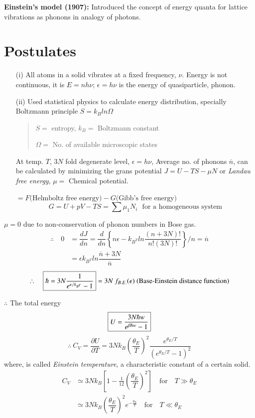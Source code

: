 \noindent
{\bf Einstein's model (1907):} Introduced the concept of energy quanta for lattice vibrations as phonons in analogy of photons.

\section*{Postulates}
\begin{itemize}
\itemsep=0pt
\item[(i)] All atoms in a solid vibrates at a fixed frequency, $\nu$. Energy is not continuous, it is $E=nh\nu$; $\epsilon=h\nu$ is the energy of quasiparticle, phonon.

\item[(ii)] Used statistical physics to calculate energy distribution, specially Boltzmann principle $S=k_{B}ln\Omega$
\begin{quote}
$S=$ entropy, $k_{B}=$ Boltzmann constant

$\Omega=$ No. of available microscopic states
\end{quote}
At temp. $T$, $3N$ fold degenerate level, $\epsilon=h\nu$, Average no. of phonons $\overline{n}$, can be calculated by minimizing the grans potential $J=U-TS-\mu N$ or {\em Landau free energy}, $\mu=$ Chemical potential.

$=F \text{(Helmboltz free energy)} -G \text{(Gibb's free energy)}$ 
$$
G=U+pV-TS=\sum\mu_{1}N_{i}\text{~ for a homogeneous system}
$$
\end{itemize}

$\mu=0$ due to non-conservation of phonon numbers in Bose gas.
\begin{align*}
\therefore\quad 0 &=\dfrac{dJ}{dn}=\dfrac{d}{dn}\left\{n\epsilon-k_{B^{T}}ln \dfrac{(n+3N)!}{n!(3N)!}\right\}/n=\overline{n}\\
&= \epsilon  k_{B^{T}}ln \dfrac{\overline{n}+3N}{\overline{n}}
\end{align*}
$$
\therefore\quad \fbox{$\hbar = 3N \dfrac{1}{e^{\epsilon/k_{B^{T}}}-1}$}=3N \ f_{B.E.}(\epsilon) \text{ (Base-Einstein distance function)}
$$

$\therefore$ The total energy 
$$
\fbox{$U=\dfrac{3N\hbar w}{e^{\beta\hbar w}-1}$}
$$
$$
\therefore \ C_{V}=\dfrac{\partial U}{\partial T}=3Nk_{B}\left(\dfrac{\theta_{E}}{T}\right)^{2}\dfrac{e^{\theta_{E}/T}}{(e^{\theta_{E}/T}-1)^{2}}
$$
where,  is called {\em Einstein temperature}, a characteristic constant of a certain solid.
\begin{align*}
C_{V} &\simeq 3Nk_{B}\left[1-\frac{1}{12}\left(\dfrac{\theta_{E}}{T}\right)^{2}\right]\quad\text{for}\quad T\gg \theta_{E}\\
&\simeq 3Nk_{B}\left(\dfrac{\theta_{E}}{T}\right)^{2}e^{-\frac{\theta_{E}}{T}}\quad\text{for}\quad T\ll \theta_{E}
\end{align*}

